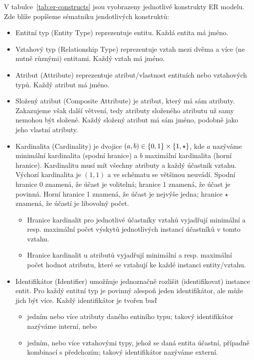 V tabulce~\ref{tab:er-constructs} jsou vyobrazeny jednotlivé konstrukty ER modelu.
Zde blíže popíšeme sématniku jendotlivých konstruktů:
\begin{itemize}
  \item Entitní typ (Entity Type) reprezentuje entitu.
        Každá entita má jméno.
  \item Vztahový typ (Relationship Type) reprezentuje vztah mezi dvěma a více (ne nutně různými) entitami.
        Každý vztah má jméno.
  \item Atribut (Attribute) reprezentuje atribut/vlastnost entitních nebo vztahových typů.
        Každý atribut má jméno.
  \item Složený atribut (Composite Attribute) je atribut, který má sám atributy.
        Zakazujeme však další větvení, tedy atributy složeného atributu už samy nemohou být složené.
        Každý složený atribut má sám jméno, podobně jako jeho vlastní atributy.
  \item Kardinalita (Cardinality) je dvojice $(a, b) \in \left\{0, 1\right\}\times \left\{1, \star\right\}$, kde $a$ nazýváme minimální kardinalita (spodní hranice) a $b$ maximální kardinalita (horní hranice).
        Kardinalitu musí mít všechny atributy a každý účastník vztahu.
        Výchozí kardinalita je $(1, 1)$ a ve schématu se většinou neuvádí.
        Spodní hranice 0 znamená, že účast je volitelná; hranice 1 znamená, že účast je povinná.
        Horní hranice 1 znamená, že účast je nejvýše jedna; hranice $\star$ znamená, že účastí je libovolný počet.
        \begin{itemize}
          \item Hranice kardinalit pro jednotlivé účastníky vztahů vyjadřují minimální a resp. maximální počet výskytů jednotlivých instancí účastníků v tomto vztahu.
          \item Hranice kardinalit u atributů vyjadřují minimální a resp. maximální počet hodnot atributu, které se vztahují ke každé instanci entity/vztahu.
        \end{itemize}
  \item Identifikátor (Identifier) umožňuje jednoznačně rozlišit (identifikovat) instance entit.
        Pro každý entitní typ je povinný alespoň jeden identifikátor, ale může jich být více.
        Každý identifikátor je tvořen buď
        \begin{itemize}
          \item jedním nebo více atributy daného entiního typu; takový identifikátor nazýváme interní, nebo
          \item jedním, nebo více vztahovými typy, jehož se daná entita účastní, případně kombinací s předchozím; takový identifikátor nazýváme externí.
        \end{itemize}
\end{itemize}

